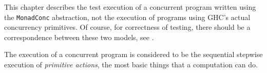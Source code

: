 This chapter describes the test execution of a concurrent program
written using the \verb|MonadConc| abstraction, not the execution of
programs using GHC's actual concurrency primitives. Of course, for
correctness of testing, there should be a correspondence between these
two models, see .

The execution of a concurrent program is considered to be the
sequential stepwise execution of \emph{primitive actions}, the most
basic things that a computation can do.
